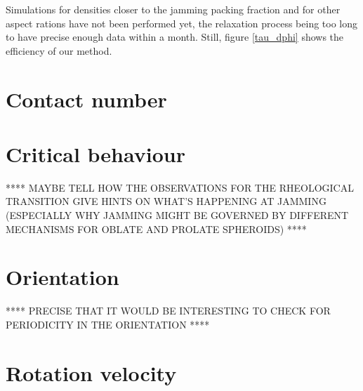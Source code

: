\documentclass[class=report, float=false, crop=false]{standalone}
\begin{document}
Simulations for densities closer to the jamming packing fraction and for other aspect rations have not been performed yet, the relaxation process being too long to have precise enough data within a month. Still, figure \ref{tau_dphi} shows the efficiency of our method.

\section{Contact number}

\section{Critical behaviour}

**** MAYBE TELL HOW THE OBSERVATIONS FOR THE RHEOLOGICAL TRANSITION GIVE HINTS ON WHAT'S HAPPENING AT JAMMING (ESPECIALLY WHY JAMMING MIGHT BE GOVERNED BY DIFFERENT MECHANISMS FOR OBLATE AND PROLATE SPHEROIDS) ****

\section{Orientation}

**** PRECISE THAT IT WOULD BE INTERESTING TO CHECK FOR PERIODICITY IN THE ORIENTATION ****

\section{Rotation velocity}

% 
\end{document}
